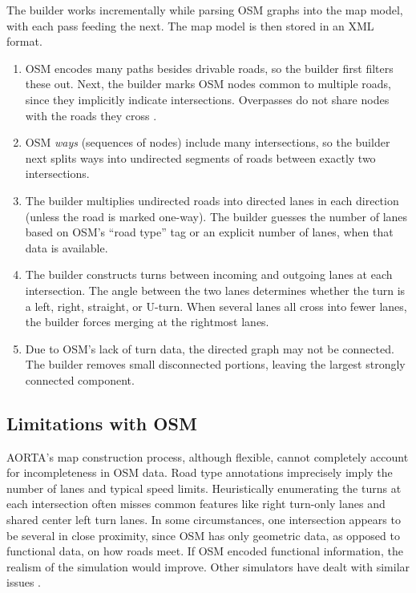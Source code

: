 \documentclass[letterpaper, 10 pt, conference]{ieeeconf}  %
\begin{document}
The builder works incrementally while parsing OSM graphs into the map model,
with each pass feeding the next. The map model is then stored in an XML format.
\begin{enumerate}
  \item OSM encodes many paths besides drivable roads, so the builder first filters
        these out. Next, the builder marks OSM nodes common to multiple roads, since
        they implicitly indicate intersections. Overpasses do not share nodes
        with the roads they cross \cite{osmOverpass}.
  \item OSM \emph{ways} (sequences of nodes) include many
        intersections, so the builder next splits ways into undirected
        segments of roads between exactly two intersections.
  \item The builder multiplies undirected roads into directed lanes in each
        direction (unless the road is marked one-way). The builder guesses the
        number of lanes based on OSM's ``road type'' tag or an explicit number of
        lanes, when that data is available.
  \item The builder constructs turns between incoming and outgoing lanes at each
        intersection. The angle between the two lanes determines whether the turn is
        a left, right, straight, or U-turn. When several lanes all cross into fewer
        lanes, the builder forces merging at the rightmost lanes. 
  \item Due to OSM's lack of turn data, the directed graph may not be connected.
        The builder removes small disconnected portions, leaving the largest
        strongly connected component.
\end{enumerate}

\subsection{Limitations with OSM}
\label{sec:osmlimits}

AORTA's map construction process, although flexible, cannot completely account
for incompleteness in OSM data. Road type annotations imprecisely imply the
number of lanes and typical speed limits. Heuristically enumerating the turns at
each intersection often misses common features like right turn-only lanes and
shared center left turn lanes. In some circumstances, one intersection appears
to be several in close proximity, since OSM has only geometric data, as opposed
to functional data, on how roads meet. If OSM encoded functional information,
the realism of the simulation would improve. Other simulators have dealt with
similar issues \cite{Krajzewicz_Hertkorn_Ringel_Wagner_2005}.
\end{document}
